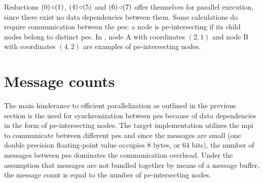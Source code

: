 Reductions $(0) \operatorname{\circ} (1)$, $(4) \operatorname{\circ} (5)$ and $(6) \operatorname{\circ} (7)$ offer themselves for parallel execution, since there exist no data dependencies between them.
Some calculations do require communication between the \glspl{pe}:
a node is \gls{pe}-intersecting if its child nodes belong to distinct \glspl{pe}.
In , node A with coordinates $(2,1)$ and node B with coordinates $(4,2)$ are examples of \gls{pe}-intersecting nodes.

\section{Message counts}
The main hinderance to efficient parallelization as outlined in the previous section is the need for synchronization between \glspl{pe} because of data dependencies in the form of \gls{pe}-intersecting nodes.
The target implementation utilizes the \gls{mpi} to communicate between different \glspl{pe} and since the messages are small (one double precision floating-point value occupies 8 bytes, or 64 bits), the number of messages between \glspl{pe} dominates the communication overhead.
Under the assumption that messages are not bundled together by means of a message buffer, the message count is equal to the number of \gls{pe}-intersecting nodes.

